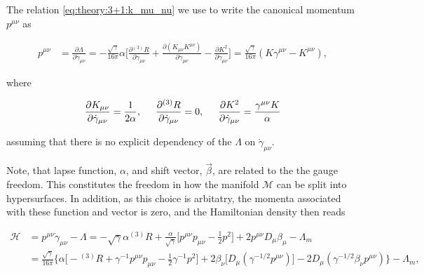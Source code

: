 \documentclass[11pt,a4paper,headinclude=true,DIV=14,BCOR=8mm,chapterprefix,listof=totoc,twoside,openright,abstracton]{scrbook}
\begin{document}
The relation \ref{eq:theory:3+1:k_mu_nu} we use to write the canonical momentum $p^{\mu\nu}$ as

\begin{align}
p^{\mu\nu} &= \frac{\partial\Lambda}{\partial\dot{\gamma}_{\mu\nu}} 
= -\frac{\sqrt{\gamma}}{16\pi}\alpha\Bigg[\frac{\partial {^{(3)}R}}{\partial\dot{\gamma}_{\mu\nu}} + \frac{\partial(K_{\mu\nu}K^{\mu\nu})}{\partial\dot{\gamma}_{\mu\nu}} - \frac{\partial K^2}{\partial\dot{\gamma}_{\mu\nu}}\Bigg] 
= \frac{\sqrt{\gamma}}{16\pi}(K\gamma^{\mu\nu} - K^{\mu\nu}),
\end{align}

where 

\begin{equation}
\frac{\partial K_{\mu\nu}}{\partial \dot{\gamma}_{\mu\nu}} = \frac{1}{2\alpha}, \hspace{5mm} \frac{\partial {^{(3)}R}}{\partial \dot{\gamma}_{\mu\nu}} = 0, \hspace{5mm}\frac{\partial K^2}{\partial \dot{\gamma}_{\mu\nu}} = \frac{\gamma^{\mu\nu}K}{\alpha}
\end{equation}

assuming that there is no explicit dependency of the $\Lambda$ on $\dot{\gamma}_{\mu\nu}$.

Note, that lapse function, $\alpha$, and shift vector, $\vec{\beta}$, are related to the the gauge freedom. This constitutes the freedom in how the manifold $\mathcal{M}$ can be split into hypersurfaces. In addition, as this choice is arbitatry, the momenta associated with these function and vector is zero, and the Hamiltonian density then reads

\begin{align}
\mathcal{H} &= p^{\mu\nu}\dot{\gamma}_{\mu\nu} - \Lambda = -\sqrt{\gamma}\alpha{^{(3)}R} + \frac{\alpha}{\sqrt{\gamma}}\Big[p^{\mu\nu}p_{\mu\nu}-\frac{1}{2}p^2\Big] + 2p^{\mu\nu} D_{\mu}\beta_{\mu} -\Lambda_m \\
&= \frac{\sqrt{\gamma}}{16\pi}\Bigg\{\alpha\Big[ -{^{(3)}R} + \gamma^{-1}p^{\mu\nu}p_{\mu\nu}-\frac{1}{2}\gamma^{-1}p^2\Big] +  2\beta_{\nu}\Big[D_{\mu}(\gamma^{-1/2}p^{\mu\nu})\Big] - 2D_{\mu}(\gamma^{-1/2}\beta_{\nu}p^{\mu\nu}) \Bigg\} - \Lambda_m,
\end{align}
\end{document}
